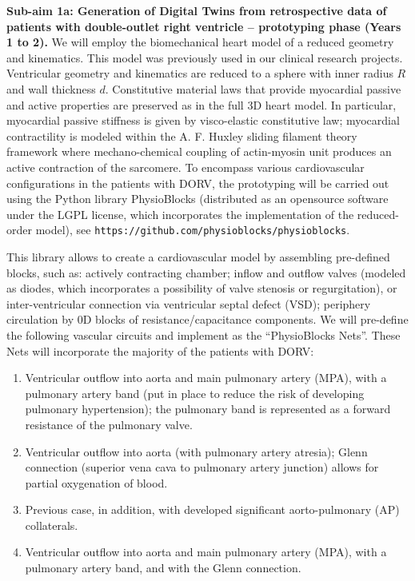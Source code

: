 \textbf{Sub-aim 1a: Generation of Digital Twins from retrospective data of patients with double-outlet right ventricle -- prototyping phase (Years 1 to 2).} 
We will employ the biomechanical heart model of a reduced geometry and kinematics\cite{caruel13}. This model was previously used in our clinical research projects\cite{ruijsink20,legall20,gusseva23,gusseva25}. Ventricular geometry and kinematics are reduced to a sphere with inner radius $R$ and wall thickness $d$. %
Constitutive material laws that provide myocardial passive and active properties are preserved as in the full 3D heart model. In particular, myocardial passive stiffness is given by visco-elastic constitutive law; myocardial contractility is modeled within the A. F. Huxley sliding filament theory framework where mechano-chemical coupling of actin-myosin unit produces an active contraction of the sarcomere\cite{caruel13}. 
To encompass various cardiovascular configurations in the patients with DORV, the prototyping will be carried out using the Python library PhysioBlocks (distributed as an opensource software under the LGPL license, which incorporates the implementation of the reduced-order model\cite{caruel13}), see 
\texttt{https://github.com/physioblocks/physioblocks}.

This library allows to create a cardiovascular model by assembling pre-defined blocks, such as: actively contracting chamber; inflow and outflow valves (modeled as diodes, which incorporates a possibility of valve stenosis or regurgitation\cite{gusseva21}), or inter-ventricular connection via ventricular septal defect (VSD); periphery circulation by 0D blocks of resistance/capacitance components. %
We will pre-define the following vascular circuits and implement as the ``PhysioBlocks Nets''. These Nets will incorporate the majority of the patients with DORV: %
\begin{enumerate}
\item Ventricular outflow into aorta and main pulmonary artery (MPA), with a pulmonary artery band (put in place to reduce the risk of developing pulmonary hypertension); the pulmonary band is represented as a forward resistance of the pulmonary valve\cite{gusseva25}.
\item{Ventricular outflow into aorta (with pulmonary artery atresia); Glenn connection (superior vena cava to pulmonary artery junction) allows for partial oxygenation of blood}.
\item{Previous case, in addition, with developed significant aorto-pulmonary (AP) collaterals.}
\item{Ventricular outflow into aorta and main pulmonary artery (MPA), with a pulmonary artery band, and with the Glenn connection}.
\end{enumerate}



